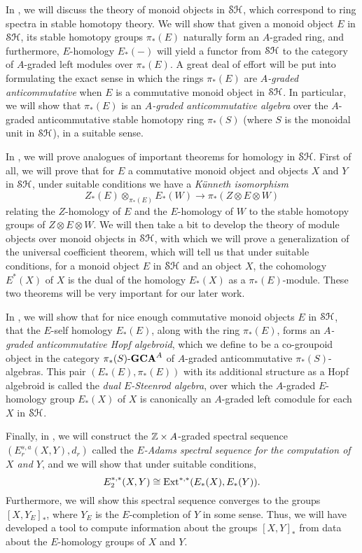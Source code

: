 \documentclass[../main.tex]{subfiles}
\begin{document}
In , we will discuss the theory of monoid objects in $\mathcal{SH}$, which correspond to ring spectra in stable homotopy theory. We will show that given a monoid object $E$ in $\mathcal{SH}$, its stable homotopy groups $\pi_*(E)$ naturally form an $A$-graded ring, and furthermore, $E$-homology $E_*(-)$ will yield a functor from $\mathcal{SH}$ to the category of $A$-graded left modules over $\pi_*(E)$. A great deal of effort will be put into formulating the exact sense in which the rings $\pi_*(E)$ are \emph{$A$-graded anticommutative} when $E$ is a commutative monoid object in $\mathcal{SH}$. In particular, we will show that $\pi_*(E)$ is an \emph{$A$-graded anticommutative algebra} over the $A$-graded anticommutative stable homotopy ring $\pi_*(S)$ (where $S$ is the monoidal unit in $\mathcal{SH}$), in a suitable sense.

In , we will prove analogues of important theorems for homology in $\mathcal{SH}$. First of all, we will prove that for $E$ a commutative monoid object and objects $X$ and $Y$ in $\mathcal{SH}$, under suitable conditions we have a \emph{K\"unneth isomorphism}
\[Z_*(E)\otimes_{\pi_*(E)}E_*(W)\to\pi_*(Z\otimes E\otimes W)\]
relating the $Z$-homology of $E$ and the $E$-homology of $W$ to the stable homotopy groups of $Z\otimes E\otimes W$. We will then take a bit to develop the theory of module objects over monoid objects in $\mathcal{SH}$, with which we will prove a generalization of the universal coefficient theorem, which will tell us that under suitable conditions, for a monoid object $E$ in $\mathcal{SH}$ and an object $X$, the cohomology $E^*(X)$ of $X$ is the dual of the homology $E_*(X)$ as a $\pi_*(E)$-module. These two theorems will be very important for our later work.

In , we will show that for nice enough commutative monoid objects $E$ in $\mathcal{SH}$, that the $E$-self homology $E_*(E)$, along with the ring $\pi_*(E)$, forms an \emph{$A$-graded anticommutative Hopf algebroid}, which we define to be a co-groupoid object in the category $\pi_*(S)\text-\mathbf{GCA}^A$ of $A$-graded anticommutative $\pi_*(S)$-algebras. This pair $(E_*(E),\pi_*(E))$ with its additional structure as a Hopf algebroid is called the \emph{dual $E$-Steenrod algebra}, over which the $A$-graded $E$-homology group $E_*(X)$ of $X$ is canonically an $A$-graded left comodule for each $X$ in $\mathcal{SH}$.

Finally, in , we will construct the $\mathbb{Z}\times A$-graded spectral sequence $(E_r^{s,a}(X,Y),d_r)$ called the \emph{$E$-Adams spectral sequence for the computation of $X$ and $Y$}, and we will show that under suitable conditions,
\[E_2^{*,*}(X,Y)\cong\mathrm{Ext}^{*,*}(E_{*}(X),E_*(Y)).\]
Furthermore, we will show this spectral sequence converges to the groups ${[X,Y_E]}_*$, where $Y_E$ is the $E$-completion of $Y$ in some sense. Thus, we will have developed a tool to compute information about the groups ${[X,Y]}_*$ from data about the $E$-homology groups of $X$ and $Y$.

\end{document}
